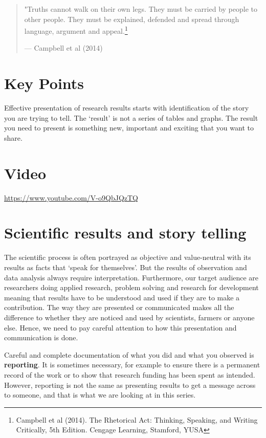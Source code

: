 \documentclass[
]{book}
\begin{document}
\begin{quote}
"Truths cannot walk on their own legs. They must be carried by people to other people. They must be explained, defended and spread through language, argument and appeal.\footnote{Campbell et al (2014). The Rhetorical Act: Thinking, Speaking, and Writing Critically, 5th Edition. Cengage Learning, Stamford, YUSA}

\hfill --- Campbell et al (2014)
\end{quote}

\hypertarget{key-points}{%
\section{Key Points}\label{key-points}}

Effective presentation of research results starts with identification of the story you are trying to tell. The `result' is not a series of tables and graphs. The result you need to present is something new, important and exciting that you want to share.

\hypertarget{video}{%
\section{Video}\label{video}}

\label{fig:unnamed-chunk-2}\url{https://www.youtube.com/V-o9QbJQzTQ}

\hypertarget{scientific-results-and-story-telling}{%
\section{Scientific results and story telling}\label{scientific-results-and-story-telling}}

The scientific process is often portrayed as objective and value-neutral with its results as facts that `speak for themselves'. But the results of observation and data analysis always require interpretation. Furthermore, our target audience are researchers doing applied research, problem solving and research for development meaning that results have to be understood and used if they are to make a contribution. The way they are presented or communicated makes all the difference to whether they are noticed and used by scientists, farmers or anyone else. Hence, we need to pay careful attention to how this presentation and communication is done.

Careful and complete documentation of what you did and what you observed is \textbf{reporting}. It is sometimes necessary, for example to ensure there is a permanent record of the work or to show that research funding has been spent as intended. However, reporting is not the same as presenting results to get a message across to someone, and that is what we are looking at in this series.
\end{document}
